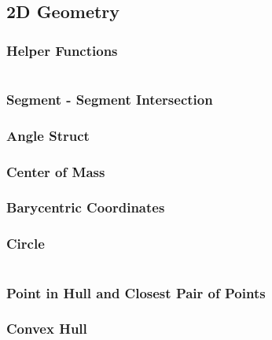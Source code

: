 \subsection{2D Geometry}
\subsubsection{Helper Functions}

\noindent \hrulefill \vspace{-\baselineskip}
\begin{multicols}{2}
\inputminted[autogobble,fontsize=\tiny]{C++}{Geometry/random_geometry.cpp}
\end{multicols}
\vspace{-\baselineskip}
\noindent \hrulefill

\subsubsection{Segment - Segment Intersection}
\subsubsection{Angle Struct}
\subsubsection{Center of Mass}
\subsubsection{Barycentric Coordinates}
\subsubsection{Circle}

\noindent \hrulefill \vspace{-\baselineskip}
\begin{multicols}{2}
\inputminted[autogobble,fontsize=\tiny]{C++}{Geometry/circle.cpp}
\end{multicols}
\vspace{-\baselineskip}
\noindent \hrulefill

\subsubsection{Point in Hull and Closest Pair of Points}

\newpage

\subsubsection{Convex Hull}

